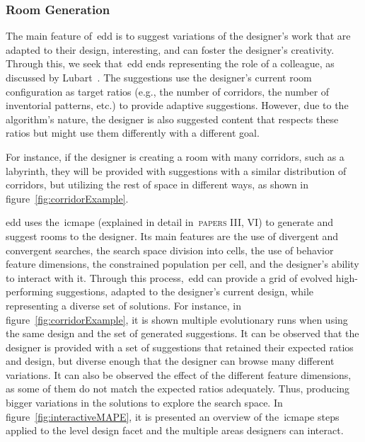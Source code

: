 
\subsubsection{Room Generation}

The main feature of~\acrshort{edd} is to suggest variations of the designer's work that are adapted to their design, interesting, and can foster the designer's creativity. Through this, we seek that~\acrshort{edd} ends representing the role of a colleague, as discussed by Lubart~\cite{lubart_how_2005}. The suggestions use the designer's current room configuration as target ratios (e.g., the number of corridors, the number of inventorial patterns, etc.) to provide adaptive suggestions. However, due to the algorithm's nature, the designer is also suggested content that respects these ratios but might use them differently with a different goal.

For instance, if the designer is creating a room with many corridors, such as a labyrinth, they will be provided with suggestions with a similar distribution of corridors, but utilizing the rest of space in different ways, as shown in figure~\ref{fig:corridorExample}.

\acrshort{edd} uses the~\acrshort{icmape} (explained in detail in~\textsc{papers III, VI}) to generate and suggest rooms to the designer. Its main features are the use of divergent and convergent searches, the search space division into cells, the use of behavior feature dimensions, the constrained population per cell, and the designer's ability to interact with it. Through this process,~\acrshort{edd} can provide a grid of evolved high-performing suggestions, adapted to the designer's current design, while representing a diverse set of solutions. For instance, in figure~\ref{fig:corridorExample}, it is shown multiple evolutionary runs when using the same design and the set of generated suggestions. It can be observed that the designer is provided with a set of suggestions that retained their expected ratios and design, but diverse enough that the designer can browse many different variations. It can also be observed the effect of the different feature dimensions, as some of them do not match the expected ratios adequately. Thus, producing bigger variations in the solutions to explore the search space. In figure~\ref{fig:interactiveMAPE}, it is presented an overview of the~\acrshort{icmape} steps applied to the level design facet and the multiple areas designers can interact.


